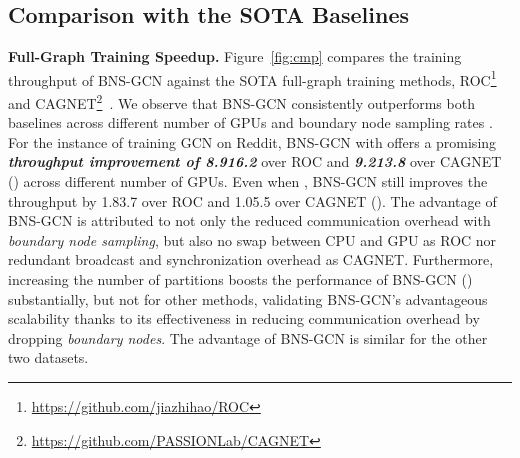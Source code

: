 \documentclass{article}
\newcommand{\niparagraph}[1]{\noindent\textbf{#1}}
\begin{document}
\subsection{
Comparison with the SOTA Baselines}
\niparagraph{Full-Graph Training Speedup.}
\label{sec:efficiency}
Figure~\ref{fig:cmp} compares the training throughput of BNS-GCN against the SOTA full-graph training methods, ROC\footnote{\href{https://github.com/jiazhihao/ROC}{https://github.com/jiazhihao/ROC}}~\citep{jia2020improving} and CAGNET\footnote{\href{https://github.com/PASSIONLab/CAGNET}{https://github.com/PASSIONLab/CAGNET}}~\citep{tripathy2020reducing}.
We observe that BNS-GCN consistently outperforms both baselines across different number of GPUs and boundary node sampling rates . 
For the instance of training GCN on Reddit, BNS-GCN with  offers a promising \textbf{\textit{throughput improvement of 8.916.2}} over ROC and \textit{\textbf{9.213.8}} over CAGNET () across different number of GPUs.
Even when , BNS-GCN still improves the throughput by 1.83.7 over ROC and 1.05.5 over CAGNET ().
The advantage of BNS-GCN is attributed to not only the reduced communication overhead with \textit{boundary node sampling}, but also no swap between CPU and GPU as ROC nor redundant broadcast and synchronization overhead as CAGNET.
Furthermore, increasing the number of partitions boosts the performance of BNS-GCN () substantially, but not for other methods, validating 
BNS-GCN's advantageous scalability thanks to its effectiveness in reducing communication overhead by dropping \textit{boundary nodes}. 
The advantage of BNS-GCN is similar for the other two datasets.
\end{document}
